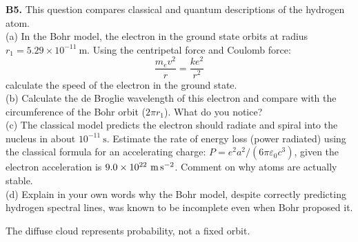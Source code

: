 \begin{exercisebox}[27]
\vspace{0.4cm}

\textbf{B5.} This question compares classical and
quantum descriptions of the hydrogen atom.\\[4pt]
(a) In the Bohr model, the electron in the ground
state orbits at radius $r_1 = 5.29\times10^{-11}\ \text{m}$.
Using the centripetal force and Coulomb force:
\[
  \frac{m_e v^2}{r} = \frac{ke^2}{r^2}
\]
calculate the speed of the electron in the ground state.\\
(b) Calculate the de Broglie wavelength of this
electron and compare with the circumference of
the Bohr orbit ($2\pi r_1$). What do you notice?\\
(c) The classical model predicts the electron
should radiate and spiral into the nucleus in
about $10^{-11}\ \text{s}$. Estimate the rate of
energy loss (power radiated) using the classical
formula for an accelerating charge:
$P = e^2a^2/(6\pi\varepsilon_0 c^3)$,
given the electron acceleration is
$9.0\times10^{22}\ \text{m\,s}^{-2}$.
Comment on why atoms are actually stable.\\
(d) Explain in your own words why the Bohr model,
despite correctly predicting hydrogen spectral
lines, was known to be incomplete even when
Bohr proposed it.
\hfill{}

\begin{center}
\par\smallskip\footnotesize The diffuse cloud represents probability, not a fixed orbit.
\end{center}

\end{exercisebox}

